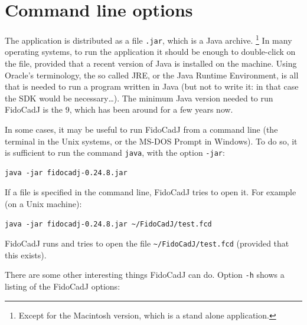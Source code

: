 \documentclass[10pt,a4paper,twoside]{scrreprt}
\begin{document}
\section{Command line options}

The application is distributed as a file \lstinline!.jar!,
which is a Java archive.%
\footnote{Except for the Macintosh version, which is a stand
alone application.%
} In many operating systems, to run the application it should be enough
to double-click on the file, provided that a recent version of Java
is installed on the machine. Using Oracle's terminology,
the so called JRE, or the Java Runtime Environment, is
all that is needed to run a program written in Java (but not to write
it: in that case the SDK would be necessary\dots). The minimum Java
version needed to run FidoCadJ is the 9, which has been around for
a few years now.

In some cases, it may be useful to run FidoCadJ from a command line
(the terminal in the Unix systems, or
the MS-DOS Prompt in Windows).
To do so, it is sufficient to run the command \lstinline!java!, with
the option \lstinline!-jar!:
\begin{lstlisting}
java -jar fidocadj-0.24.8.jar
\end{lstlisting}

If a file is specified in the command line, FidoCadJ tries to open it. For example (on a Unix machine):
\begin{lstlisting}
java -jar fidocadj-0.24.8.jar ~/FidoCadJ/test.fcd
\end{lstlisting}

FidoCadJ runs and tries to open the file \lstinline!~/FidoCadJ/test.fcd!
(provided that this exists).

There are some other interesting things FidoCadJ can do.
Option \lstinline!-h! shows a listing of the FidoCadJ options:
\end{document}
